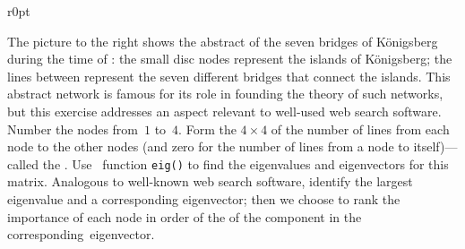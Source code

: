 \begin{exercise}  
\begin{wrapfigure}r{0pt}
\end{wrapfigure}
The picture to the right shows the abstract  of the seven bridges of K\"onigsberg during the time of : the small disc nodes represent the islands of K\"onigsberg; the lines between represent the seven different bridges that connect the islands.
This abstract network is famous for its role in founding the theory of such networks, but this exercise addresses an aspect relevant to well-used web search software.
Number the nodes from~\(1\) to~\(4\).
Form the \(4\times 4\)  of the number of lines from each node to the other nodes (and zero for the number of lines from a node to itself)---called the .
Use \script\ function \verb|eig()| to find the eigenvalues and eigenvectors for this matrix.
Analogous to well-known web search software, identify the largest eigenvalue and a corresponding eigenvector;  then we choose to rank the importance of each node in order of the  of the component in the corresponding~eigenvector.
\end{exercise}



